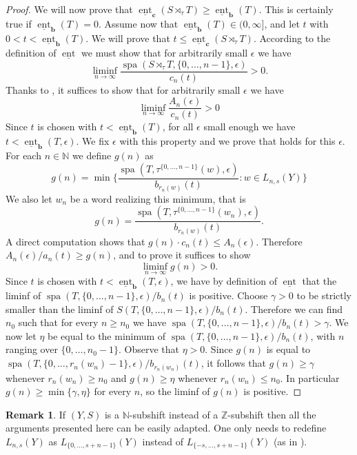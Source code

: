 \documentclass[a4paper,oneside]{amsart}
\renewcommand{\(}{\begin{dmath*}}
\renewcommand{\)}{\end{dmath*}}
\theoremstyle{definition}
\newtheorem{remark}{Remark}
\newcommand{\N}{\mathbb{N}}
\newcommand{\Z}{\mathbb{Z}}
\newcommand{\lowerent}{\underline{\operatorname{ent}}}
\newcommand{\spa}{\operatorname{spa}}
\begin{document}
\begin{proof}
We will now prove that $\lowerent_{\textbf{c}}(S\rtimes_\tau T)\geq \lowerent_{\textbf{b}}(T)$. This is certainly true if $\lowerent_{\textbf{b}}(T)=0$. Assume now that $\lowerent_{\textbf{b}}(T)\in (0,\infty]$, and let $t$ with $0<t<\lowerent_{\textbf{b}}(T)$. We will prove that $t\leq \lowerent_{\textbf{c}}(S\rtimes_\tau T)$. According to the definition of $\lowerent$ we must show that for arbitrarily small $\epsilon$ we have
\[\liminf_{n\to\infty} \frac{\spa(S\rtimes_\tau T,\{0,\dots,n-1\},\epsilon)}{c_n(t)}> 0.\]
Thanks to , it suffices to show that for arbitrarily small $\epsilon$ we have
\begin{equation}\label{liminf-slow}\liminf_{n\to\infty} \frac{A_n(\epsilon)}{c_n(t)}> 0\end{equation}
Since $t$ is chosen with $t<\lowerent_{\textbf{b}}(T)$, for all $\epsilon$ small enough we have $t<\lowerent_{\textbf{b}}(T,\epsilon)$. We fix $\epsilon$ with this property and we prove that  holds for this $\epsilon$. For each $n\in\N$ we define $g(n)$ as 
    \[g(n)=\min \{\frac{\spa(T,\tau^{\{0,\dots,n-1\}}(w),\epsilon)}{b_{r_n(w)}(t)} : w\in L_{n,s}(Y)\}\]
We also let $w_n$ be a word realizing this minimum, that is \[g(n)=\frac{\spa(T,\tau^{\{0,\dots,n-1\}}(w_n),\epsilon)}{b_{r_n(w)}(t)}.\]
A direct computation shows that $g(n)\cdot c_n(t)\leq A_n(\epsilon)$. Therefore $A_n(\epsilon)/a_n(t)\geq g(n)$, and to prove  it suffices to show
\[\liminf_{n\to\infty} g(n)>0.\]
Since $t$ is chosen with $t<\lowerent_{\textbf{b}}(T,\epsilon)$, we have by definition of $\lowerent$ that the liminf of $\spa(T,\{0,\dots,n-1\},\epsilon)/b_n(t)$ is positive. Choose $\gamma>0$ to be strictly smaller than the liminf of $S(T,\{0,\dots,n-1\},\epsilon)/b_n(t)$. Therefore we can find $n_0$ such that for every $n\geq n_0$ we have $\spa(T,\{0,\dots,n-1\},\epsilon)/b_n(t)>\gamma$. We now let $\eta$ be equal to the minimum of  $\spa(T,\{0,\dots,n-1\},\epsilon)/b_n(t)$, with $n$ ranging over $\{0,\dots,n_0-1\}$. Observe that $\eta>0$. Since $g(n)$ is equal to $\spa(T,\{0,\dots,r_n(w_n)-1\},\epsilon)/b_{r_n(w_n)}(t)$, it follows that $g(n)\geq \gamma$ whenever $r_n(w_n)\geq n_0$ and $g(n)\geq \eta$ whenever $r_n(w_n)\leq n_0$. In particular $g(n)\geq \min\{\gamma,\eta\}$ for every $n$, so the liminf of $g(n)$ is  positive.  
\end{proof}
\begin{remark}\label{non-invertible}
    If $(Y,S)$ is a $\N$-subshift instead of a $\Z$-subshift then all the arguments presented here can be easily adapted. One only needs to redefine $L_{n,s}(Y)$ as $L_{\{0,\dots,s+n-1\}}(Y)$ instead of $L_{\{-s,\dots,s+n-1\}}(Y)$  (as in ). 
\end{remark}
\end{document}
